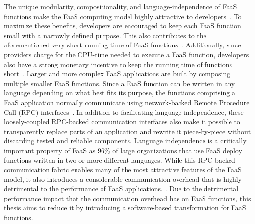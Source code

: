 \documentclass[../main.tex]{subfiles}
\begin{document}
\begin{refsection}
The unique modularity, compositionality, and language-independence of
FaaS functions make the FaaS computing model highly attractive to
developers~\cite{williams16_growin_need_micros_bioin}. To maximize
these benefits, developers are encouraged to keep each FaaS
function small with a narrowly defined purpose. This also contributes
to the aforementioned very short running time of FaaS
functions~\cite{shahrad19_archit_implic_funct_servic_comput,mahgoub22_wisef,shahrad20_server_wild,lukewarm_serverless,du20_catal}. Additionally,
since providers charge for the CPU-time needed to execute a FaaS
function, developers also have a strong monetary incentive to keep the
running time of functions short~\cite{faas_procing}.  Larger and more
complex FaaS applications are built by composing multiple smaller FaaS
functions. Since a FaaS function can be written in any language
depending on what best fits its purpose, the functions comprising a
FaaS application normally communicate using network-backed Remote
Procedure Call (RPC)
interfaces~\cite{gan19_open_sourc_bench_suite_micros}. In addition to
facilitating language-independence, these loosely-coupled RPC-backed
communication interfaces also make it possible to transparently
replace parts of an application and rewrite it piece-by-piece
without discarding tested and reliable components. Language
independence is a critically important property of FaaS as 96\% of
large organizations that use FaaS deploy functions written in two or
more different languages\cite{serverless_state}. While this RPC-backed
communication fabric enables many of the most attractive features of
the FaaS model, it also introduces a considerable communication
overhead that is highly detrimental to the performance of FaaS
applications.  . Due
to the detrimental performance impact that the communication overhead
has on FaaS functions, this thesis aims to reduce it by introducing a
software-based transformation for FaaS functions.





\end{refsection}
\end{document}
